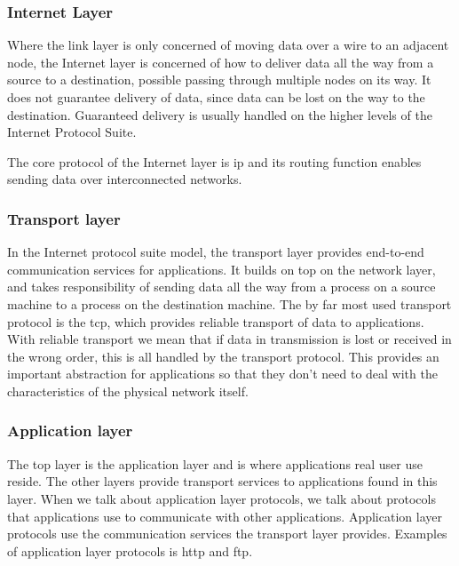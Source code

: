 \subsubsection{Internet Layer}

 Where the link layer is only concerned of moving data over a wire to an
 adjacent node, the Internet layer is concerned of how to deliver data all the
 way from a source to a destination, possible passing through multiple nodes on
 its way. It does not guarantee delivery of data, since data can be lost on the
 way to the destination. Guaranteed delivery is usually handled on the higher
 levels of the Internet Protocol Suite.

 The core protocol of the Internet layer is \gls{ip} and its routing function
 enables sending data over interconnected networks.

\subsubsection{Transport layer}

In the Internet protocol suite model, the transport layer provides end-to-end
communication services for applications. It builds on top on the network layer,
and takes responsibility of sending data all the way from a process on a source
machine to a process on the destination machine. The by far most used transport
protocol is the \gls{tcp}, which provides reliable transport of data to
applications. With reliable transport we mean that if data in transmission is
lost or received in the wrong order, this is all handled by the transport
protocol. This provides an important abstraction for applications so that they
don't need to deal with the characteristics of the physical network itself.

\subsubsection{Application layer}

The top layer is the application layer and is where applications real user use
reside. The other layers provide transport services to applications found in
this layer. When we talk about application layer protocols, we talk about
protocols that applications use to communicate with other applications.
Application layer protocols use the communication services the transport layer
provides.  Examples of application layer protocols is \gls{http} and \gls{ftp}.

